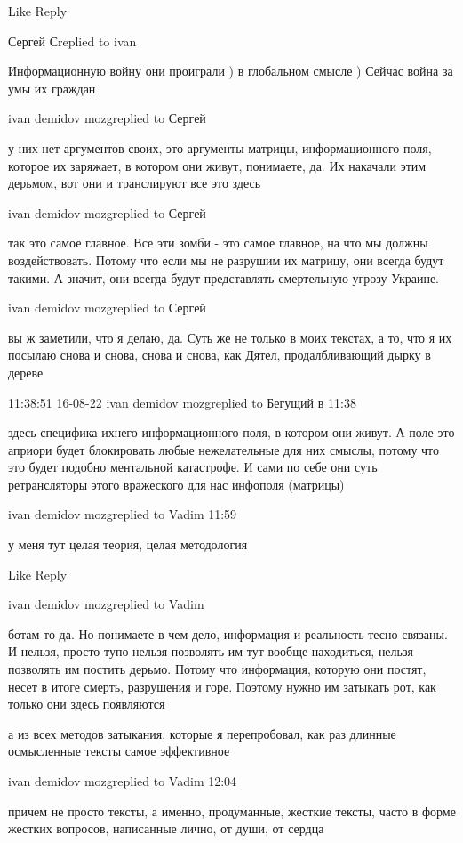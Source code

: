     Like
    Reply

Сергей Сreplied to ivan

Информационную войну они проиграли ) в глобальном смысле ) Сейчас война за умы
их граждан

ivan demidov mozgreplied to Сергей

у них нет аргументов своих, это аргументы матрицы, информационного поля,
которое их заряжает, в котором они живут, понимаете, да. Их накачали этим
дерьмом, вот они и транслируют все это здесь

ivan demidov mozgreplied to Сергей

так это самое главное. Все эти зомби - это самое главное, на что мы должны
воздействовать. Потому что если мы не разрушим их матрицу, они всегда будут
такими. А значит, они всегда будут представлять смертельную угрозу Украине.

ivan demidov mozgreplied to Сергей

вы ж заметили, что я делаю, да. Суть же не только в моих текстах, а то, что я
их посылаю снова и снова, снова и снова, как Дятел, продалбливающий дырку в
дереве


11:38:51 16-08-22
ivan demidov mozgreplied to Бегущий в
11:38

здесь специфика ихнего информационного поля, в котором они живут. А поле это
априори будет блокировать любые нежелательные для них смыслы, потому что это
будет подобно ментальной катастрофе. И сами по себе они суть ретрансляторы
этого вражеского для нас инфополя (матрицы)

ivan demidov mozgreplied to Vadim
11:59

у меня тут целая теория, целая методология

    Like
    Reply

ivan demidov mozgreplied to Vadim

ботам то да. Но понимаете в чем дело, информация и реальность тесно связаны. И
нельзя, просто тупо нельзя позволять им тут вообще находиться, нельзя позволять
им постить дерьмо. Потому что информация, которую они постят, несет в итоге
смерть, разрушения и горе. Поэтому нужно им затыкать рот, как только они здесь
появляются

а из всех методов затыкания, которые я перепробовал, как раз длинные
осмысленные тексты самое эффективное

ivan demidov mozgreplied to Vadim
12:04

причем не просто тексты, а именно, продуманные, жесткие тексты, часто в форме
жестких вопросов, написанные лично, от души, от сердца

